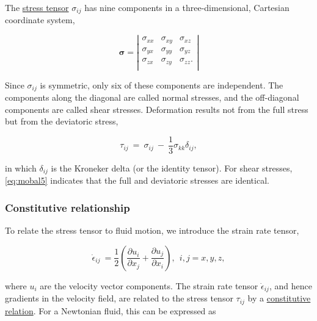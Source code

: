 The \href{http://en.wikipedia.org/wiki/Stress_tensor}{stress tensor} $\sigma_{ij}$ has nine components in a three-dimensional,
Cartesian coordinate system,

\begin{equation}
\mathbf{\sigma} =
\left\vert  \begin{array}{ccc} 
    \sigma _{ xx} & \sigma _{ xy} & \sigma _{ xz} \\
    \sigma _{ yx} & \sigma _{ yy} & \sigma _{ yz} \\
    \sigma _{ zx} & \sigma _{ zy} & \sigma _{ zz}. \\
\end{array} \right\vert 
\label{eq:mobal4}
\end{equation}

\noindent
Since $\sigma_{ij}$ is symmetric, only six of these components are independent.
The components along the diagonal are called normal stresses, and the off-diagonal components are called shear stresses. 
Deformation results not from the full stress but from the deviatoric stress,

\begin{equation}
\tau_{ ij} ~ = ~ \sigma _{ ij} ~ - ~{\frac{ 1}{ 3}} \sigma _{ kk} \delta _{ ij},
\label{eq:mobal5}
\end{equation}

\noindent
in which $\delta_{ ij}$ is the Kroneker delta (or the identity tensor). For shear stresses, \eqref{eq:mobal5} indicates that
the full and deviatoric stresses are identical.

\subsubsection{Constitutive relationship}

To relate the stress tensor to fluid motion, we introduce the strain rate tensor,

\begin{equation}
\dot{\epsilon}_{ij}~= \frac{1}{2}\left( \frac{ \partial u_{i}}{\partial x_{j}} + \frac{ \partial u_{j}}{\partial x_{i}}\right), ~~i,j = x,y,z,
\label{eq:mobal6}
\end{equation}

\noindent
where $u_i$ are the velocity vector components. The strain rate tensor $\dot{\epsilon}_{ij}$, and hence gradients in the 
velocity field, are related to the stress tensor $\tau_{ij}$ by a \href{http://en.wikipedia.org/wiki/Constitutive_equation}
{constitutive relation}. For a Newtonian fluid, this can be expressed as

